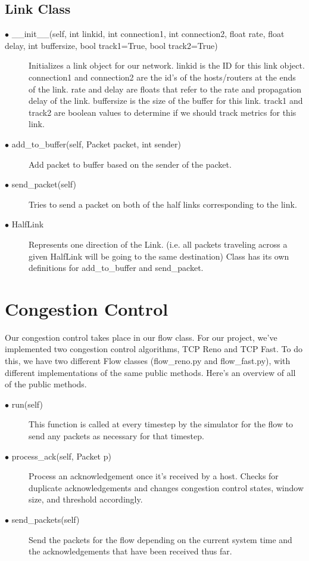 \documentclass{article}
\begin{document}
\subsection{Link Class}
\begin{description}
	\item [$\bullet$ \_\_init\_\_(self, int linkid, int connection1, int connection2, float rate, float delay, int buffersize, bool track1=True, bool track2=True)] Initializes a link object for our network. linkid is the ID for this link object. connection1 and connection2 are the id's of the hosts/routers at the ends of the link. rate and delay are floats that refer to the rate and propagation delay of the link. buffersize is the size of the buffer for this link. track1 and track2 are boolean values to determine if we should track metrics for this link. 
	\item [$\bullet$ add\_to\_buffer(self, Packet packet, int sender)] Add packet to buffer based on the sender of the packet.
	\item [$\bullet$ send\_packet(self)] Tries to send a packet on both of the half links corresponding to the link.
	\item [$\bullet$ HalfLink] Represents one direction of the Link. (i.e. all packets traveling across a given HalfLink will be going to the same destination) Class has its own definitions for add\_to\_buffer and send\_packet.
	
\end{description}

\section{Congestion Control}

Our congestion control takes place in our flow class. For our project, we've implemented two congestion control algorithms, TCP Reno and TCP Fast. To do this, we have two different Flow classes (flow\_reno.py and flow\_fast.py), with different implementations of the same public methods. Here's an overview of all of the public methods. 

\begin{description}
	\item [$\bullet$ run(self)] This function is called at every timestep by the simulator for the flow to send any packets as necessary for that timestep.
	\item [$\bullet$ process\_ack(self, Packet p)] Process an acknowledgement once it's received by a host. Checks for duplicate acknowledgements and changes congestion control states, window size, and threshold accordingly.
	\item [$\bullet$ send\_packets(self)] Send the packets for the flow depending on the current system time and the acknowledgements that have been received thus far.
\end{description}
\end{document}

